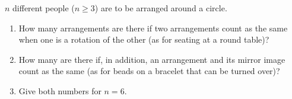 $n$ different people ($n\ge3$) are to be arranged around a circle.
\begin{enumerate}
\item[(a)] How many arrangements are there if two arrangements count as the same when one is a rotation of the other (as for seating at a round table)?
\item[(b)] How many are there if, in addition, an arrangement and its mirror image count as the same (as for beads on a bracelet that can be turned over)?
\item[(c)] Give both numbers for $n=6$.
\end{enumerate}
